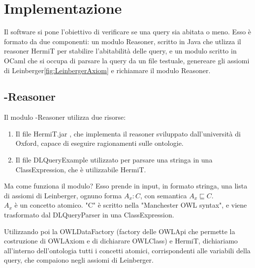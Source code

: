 \chapter[Implementazione]{Implementazione}
Il software si pone l'obiettivo di verificare se una query sia abitata o meno. Esso è formato da due componenti: un modulo Reasoner, scritto in Java che utlizza il reasoner HermiT\cite{HermiT} per stabilire l'abitabilità delle query, e un modulo scritto in OCaml che si occupa di parsare la query da un file testuale, genereare gli assiomi di Leinberger\ref{fig:LeinbergerAxiom} e richiamare il modulo Reasoner. 
    
    \section{-Reasoner}
        Il modulo -Reasoner utilizza due risorse: 
            \begin{enumerate}
                \item Il file HermiT.jar \cite{HermiT}, che implementa il reasoner sviluppato dall'università di Oxford, capace di eseguire ragionamenti sulle ontologie.
                \item Il file DLQueryExample \cite{DLQueryExample} utilizzato per parsare una stringa in una ClassExpression, che è utilizzabile HermiT. 
            \end{enumerate}

        Ma come funziona il modulo? Esso prende in input, in formato stringa, una lista di assiomi di Leinberger, ognuno forma \(A_{x} : C\), con semantica \( A_{x}\sqsubseteq C \). 
        \\\(A_{x}\) è un concetto atomico. "C" è scritto nella "Manchester OWL syntax"\cite{ManchesterOWLSyntax}, e viene trasformato dal DLQueryParser in una ClassExpression. 

        Utilizzando poi la OWLDataFactory (factory delle OWLApi che permette la costruzione di OWLAxiom e di dichiarare OWLClass) e HermiT\cite{HermiT}, dichiariamo all'interno dell'ontologia tutti i concetti atomici, corrispondenti alle variabili della query, che compaiono negli assiomi di Leinberger. 

